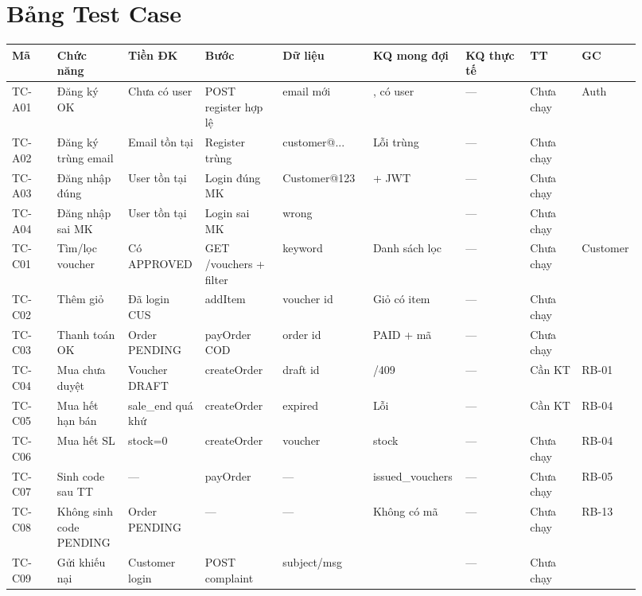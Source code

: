 \section{Bảng Test Case}
\scriptsize
\begin{longtable}{>{\raggedright\arraybackslash}p{0.07\linewidth}>{\raggedright\arraybackslash}p{0.11\linewidth}>{\raggedright\arraybackslash}p{0.10\linewidth}>{\raggedright\arraybackslash}p{0.12\linewidth}>{\raggedright\arraybackslash}p{0.14\linewidth}>{\raggedright\arraybackslash}p{0.12\linewidth}>{\raggedright\arraybackslash}p{0.10\linewidth}>{\raggedright\arraybackslash}p{0.08\linewidth}>{\raggedright\arraybackslash}p{0.08\linewidth}}
\toprule
\textbf{Mã} & \textbf{Chức năng} & \textbf{Tiền ĐK} & \textbf{Bước} & \textbf{Dữ liệu} & \textbf{KQ mong đợi} & \textbf{KQ thực tế} & \textbf{TT} & \textbf{GC}\\
\midrule
\endhead
TC-A01 & Đăng ký OK & Chưa có user & POST register hợp lệ & email mới & 201, có user & — & Chưa chạy & Auth\\
TC-A02 & Đăng ký trùng email & Email tồn tại & Register trùng & customer@... & Lỗi trùng & — & Chưa chạy & \\
TC-A03 & Đăng nhập đúng & User tồn tại & Login đúng MK & Customer@123 & 200 + JWT & — & Chưa chạy & \\
TC-A04 & Đăng nhập sai MK & User tồn tại & Login sai MK & wrong & 401 & — & Chưa chạy & \\
TC-C01 & Tìm/lọc voucher & Có APPROVED & GET /vouchers + filter & keyword & Danh sách lọc & — & Chưa chạy & Customer\\
TC-C02 & Thêm giỏ & Đã login CUS & addItem & voucher id & Giỏ có item & — & Chưa chạy & \\
TC-C03 & Thanh toán OK & Order PENDING & payOrder COD & order id & PAID + mã & — & Chưa chạy & \\
TC-C04 & Mua chưa duyệt & Voucher DRAFT & createOrder & draft id & 400/409 & — & Cần KT & RB-01\\
TC-C05 & Mua hết hạn bán & sale\_end quá khứ & createOrder & expired & Lỗi & — & Cần KT & RB-04\\
TC-C06 & Mua hết SL & stock=0 & createOrder & voucher & 409 stock & — & Chưa chạy & RB-04\\
TC-C07 & Sinh code sau TT & — & payOrder & — & issued\_vouchers & — & Chưa chạy & RB-05\\
TC-C08 & Không sinh code PENDING & Order PENDING & — & — & Không có mã & — & Chưa chạy & RB-13\\
TC-C09 & Gửi khiếu nại & Customer login & POST complaint & subject/msg & 201 & — & Chưa chạy & \\

\end{longtable}
